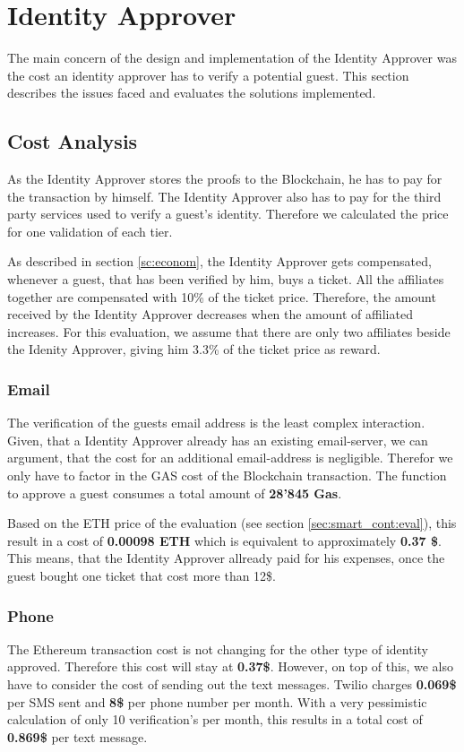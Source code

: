\section{Identity Approver}\label{sec:identity-approver}
The main concern of the design and implementation of the Identity Approver was the cost an identity approver has to verify a potential guest. This section describes the issues faced and evaluates the solutions implemented.

\subsection{Cost Analysis}
As the Identity Approver stores the proofs to the Blockchain, he has to pay for the transaction by himself. The Identity Approver also has to pay for the third party services used to verify a guest's identity. Therefore we calculated the price for one validation of each tier.

As described in section \ref{sc:econom}, the Identity Approver gets compensated, whenever a guest, that has been verified by him, buys a ticket. All the affiliates together are compensated with 10\% of the ticket price. Therefore, the amount received by the Identity Approver decreases when the amount of affiliated increases. For this evaluation, we assume that there are only two affiliates beside the Idenity Approver, giving him 3.3\% of the ticket price as reward.

\subsubsection{Email}
The verification of the guests email address is the least complex interaction. Given, that a Identity Approver already has an existing email-server, we can argument, that the cost for an additional email-address is negligible. Therefor we only have to factor in the GAS cost of the Blockchain transaction. The function to approve a guest consumes a total amount of \textbf{28'845 Gas}. 

Based on the ETH price of the evaluation (see section \ref{sec:smart_cont:eval}), this result in a cost of \textbf{0.00098 ETH} which is equivalent to approximately \textbf{0.37 \$}. This means, that the Identity Approver allready paid for his expenses, once the guest bought one ticket that cost more than 12\$. 

\subsubsection{Phone}
The Ethereum transaction cost is not changing for the other type of identity approved. Therefore this cost will stay at \textbf{0.37\$}. However, on top of this, we also have to consider the cost of sending out the text messages. Twilio charges \textbf{0.069\$} per SMS sent and \textbf{8\$} per phone number per month\cite{twillio-Cost}. With a very pessimistic calculation of only 10 verification's per month, this results in a total cost of \textbf{0.869\$} per text message.

